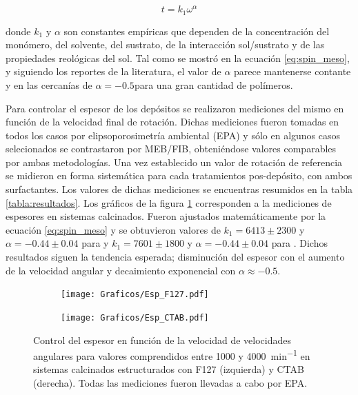 			\begin{equation}
			  t = k_1 \omega^{\alpha}
			  \label{eq:spin_meso}
			  \end{equation}		
	
		donde $k_1$ y $\alpha$ son constantes empíricas que dependen de la concentración del monómero, del solvente, del sustrato, de la interacción sol/sustrato y  de las propiedades reológicas del sol. Tal como se mostró en la ecuación \ref{eq:spin_meso}, y siguiendo los reportes de la literatura, el valor de $\alpha$ parece mantenerse contante y en las cercanías de $\alpha=-0.5$para una gran cantidad de polímeros. 

		Para controlar el espesor de los depósitos se realizaron mediciones del mismo en función de la velocidad final de rotación.  Dichas mediciones fueron tomadas en todos los casos por elipsoporosimetría ambiental (EPA) y sólo en algunos casos selecionados se contrastaron por MEB/FIB, obteniéndose valores comparables por ambas metodologías. Una vez establecido un valor de rotación de referencia se midieron en forma sistemática para cada tratamientos pos-depósito, con ambos surfactantes. Los valores de dichas mediciones se encuentras resumidos en la tabla \ref{tabla:resultados}.
		Los gráficos de la figura \ref{fig:esp} corresponden a la mediciones de espesores en sistemas calcinados. Fueron ajustados matemáticamente por la ecuación \ref{eq:spin_meso} y se obtuvieron valores de $k_1=6413\pm 2300$ y $\alpha=-0.44 \pm 0.04$ para \pdmF\space y $k_1=7601\pm 1800$ y $\alpha=-0.44 \pm 0.04$ para \pdmC. Dichos resultados siguen la tendencia esperada; disminución del espesor con el aumento de la velocidad angular y decaimiento exponencial con $\alpha \approx -0.5$. 

		
			\begin{figure}[!ht]
				\begin{subfigure}[t]{0.495\textwidth}
				\texttt{[image: Graficos/Esp\_F127.pdf]}
				\end{subfigure}
				\begin{subfigure}[t]{0.495\textwidth}
				\texttt{[image: Graficos/Esp\_CTAB.pdf]}
				\end{subfigure}
				\caption[Espesor en función de la velocidad angular]{Control del espesor en función de la velocidad de velocidades angulares para valores comprendidos entre 1000 y \SI{4000}{\minute^{-1}} en sistemas calcinados estructurados con F127 (izquierda) y CTAB (derecha). Todas las mediciones fueron llevadas a cabo por EPA.}
				\label{fig:esp}		
				\end{figure}
	
